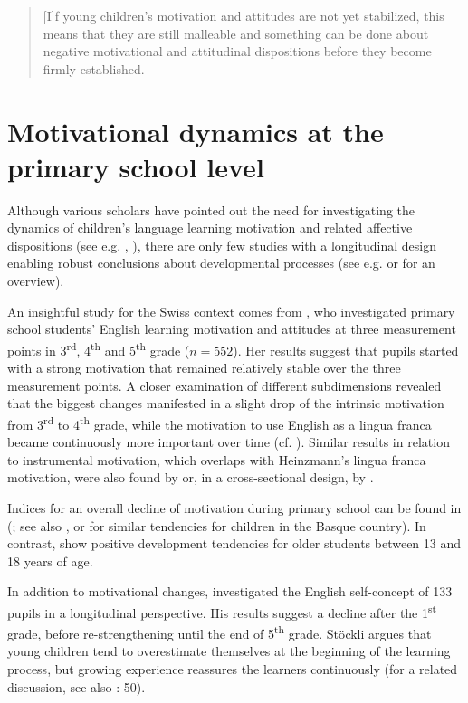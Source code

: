 \documentclass[output=paper]{langsci/langscibook}
\begin{document}
\begin{quote}
[I]f young children’s motivation and attitudes are not yet stabilized, this means that they are still malleable and something can be done about negative motivational and attitudinal dispositions before they become firmly established. \citep[4]{Heinzmann2013}
\end{quote}

\section{Motivational dynamics at the primary school level}\label{sec:08:2}

Although various scholars have pointed out the need for investigating the dynamics of children’s language learning motivation and related affective dispositions (see e.g. \citealt{Cenoz2004}, \citealt{McGroarty2001}), there are only few studies with a longitudinal design enabling robust conclusions about developmental processes (see e.g. \citealt{MihaljevicDjigunovic2012} or \citealt{MihaljevicDjigunovicNikolov2019} for an overview). 

An insightful study for the Swiss context comes from \citet{Heinzmann2013}, who investigated primary school students’ English learning motivation and attitudes at three measurement points in 3\textsuperscript{rd}, 4\textsuperscript{th} and 5\textsuperscript{th} grade ($n=552$). Her results suggest that pupils started with a strong motivation that remained relatively stable over the three measurement points. A closer examination of different subdimensions revealed that the biggest changes manifested in a slight drop of the intrinsic motivation from 3\textsuperscript{rd} to 4\textsuperscript{th} grade, while the motivation to use English as a lingua franca became continuously more important over time (cf. \citealt{Heinzmann2013}). Similar results in relation to instrumental motivation, which overlaps with Heinzmann’s lingua franca motivation, were also found by \citet{Nikolov2002} or, in a cross-sectional design, by \citet[256]{Tragant2006}.

Indices for an overall decline of motivation during primary school can be found in \citeauthor{BaderSchaer2005} (\citeyear{BaderSchaer2005}; see also \citealt{SchaerBader2003}, or \citealt{Cenoz2004} for similar tendencies for children in the Basque country). In contrast, \citet[324]{PfenningerSingleton2016} show positive development tendencies for older students between 13 and 18 years of age. 

In addition to motivational changes, \citet[93]{Stoeckli2004} investigated the English self-concept of 133 pupils in a longitudinal perspective. His results suggest a decline after the 1\textsuperscript{st} grade, before re-strengthening until the end of 5\textsuperscript{th} grade. Stöckli argues that young children tend to overestimate themselves at the beginning of the learning process, but growing experience reassures the learners continuously (for a related discussion, see also \citealt{MihaljevicDjigunovicLopriore2011}: 50).
\end{document}
